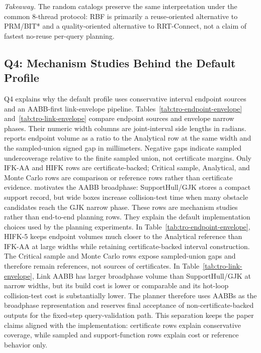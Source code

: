 \documentclass[journal]{IEEEtran}
\DeclareRobustCommand{\textsc}[1]{\textnormal{\MakeUppercase{#1}}}
\newcommand{\rbf}{\textsc{RBF}}
\let\TableOrigTiny\tiny
\let\TableOrigScriptSize\scriptsize
\let\TableOrigFootnoteSize\footnotesize
\let\TableOrigSmall\small
\newcommand{\TableFontRestore}{%
  \let\tiny\TableOrigTiny
  \let\scriptsize\TableOrigScriptSize
  \let\footnotesize\TableOrigFootnoteSize
  \let\small\TableOrigSmall
}
\begin{document}
\noindent\emph{Takeaway.}
The random catalogs preserve the same interpretation under the common 8-thread
protocol: \rbf{} is primarily a reuse-oriented alternative to PRM/BIT* and a
quality-oriented alternative to \mbox{RRT-Connect}, not a claim of fastest
no-reuse per-query planning.

\begin{table}[!t]
\centering
\TableFontRestore

\vspace{0.45ex}

\end{table}

\subsection{Q4: Mechanism Studies Behind the Default Profile}
\label{sec:exp_mechanisms}

Q4 explains why the default profile uses conservative interval endpoint sources
and an AABB-first link-envelope pipeline. Tables~\ref{tab:tro-endpoint-envelope}
and~\ref{tab:tro-link-envelope} compare endpoint sources and envelope narrow
phases. Their numeric width columns are joint-interval side lengths in radians.
reports endpoint volume as a ratio to the Analytical row at the same width and
the sampled-union signed gap in millimeters. Negative gaps indicate sampled
undercoverage relative to the finite sampled union, not certificate margins.
Only IFK-AA and HIFK rows are certificate-backed; Critical sample, Analytical,
and Monte Carlo rows are comparison or reference rows rather than certificate
evidence.
 motivates the AABB broadphase:
SupportHull/GJK stores a compact support record, but wide boxes increase
collision-test time when many obstacle candidates reach the GJK narrow phase.
These rows are mechanism studies rather than end-to-end planning rows. They
explain the default implementation choices used by the planning experiments.
In Table~\ref{tab:tro-endpoint-envelope}, HIFK-5 keeps endpoint volumes much
closer to the Analytical reference than IFK-AA at large widths while retaining
certificate-backed interval construction. The Critical sample and Monte Carlo
rows expose sampled-union gaps and therefore remain references, not sources of
certificates. In Table~\ref{tab:tro-link-envelope}, Link AABB has larger
broadphase volume than SupportHull/GJK at narrow widths, but its build cost is
lower or comparable and its hot-loop collision-test cost is substantially
lower. The planner therefore uses AABBs as the broadphase representation and
reserves final acceptance of non-certificate-backed outputs for the fixed-step
query-validation path. This separation keeps the paper claims aligned with the
implementation: certificate rows explain conservative coverage, while sampled
and support-function rows explain cost or reference behavior only.
\end{document}
